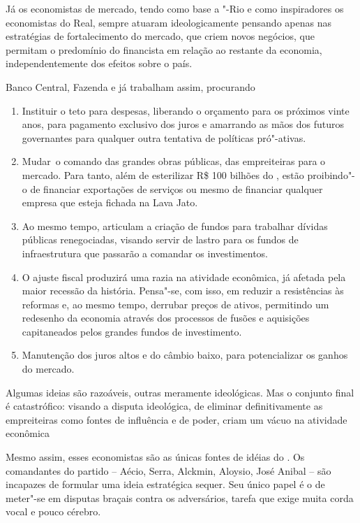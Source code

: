 Já os economistas de mercado, tendo como base a "-Rio e como
inspiradores os economistas do Real, sempre atuaram ideologicamente
pensando apenas nas estratégias de fortalecimento do mercado, que criem
novos negócios, que permitam o predomínio do financista em relação ao
restante da economia, independentemente dos efeitos sobre o país.

Banco Central, Fazenda e  já trabalham assim, procurando

\begin{enumerate}
\itemsep1pt\parskip0pt
\item
  Instituir o teto para despesas, liberando o orçamento para os próximos
  vinte anos, para pagamento exclusivo dos juros e amarrando as mãos dos
  futuros governantes para qualquer outra tentativa de políticas
  pró"-ativas.
\item
  Mudar~o comando das grandes obras públicas, das empreiteiras para o
  mercado. Para tanto, além de esterilizar R\$ 100 bilhões do ,
  estão proibindo"-o de financiar exportações de serviços ou mesmo de
  financiar qualquer empresa que esteja fichada na Lava Jato.
\item
  Ao mesmo tempo, articulam a criação de fundos para trabalhar dívidas
  públicas renegociadas, visando servir de lastro para os fundos de
  infraestrutura que passarão a comandar os investimentos.
\item
  O ajuste fiscal produzirá uma razia na atividade econômica, já afetada
  pela maior recessão da história. Pensa"-se, com isso, em reduzir a
  resistências às reformas e, ao mesmo tempo, derrubar preços de ativos,
  permitindo um redesenho da economia através dos processos de fusões e
  aquisições capitaneados pelos grandes fundos de investimento.
\item
  Manutenção dos juros altos e do câmbio baixo, para potencializar os
  ganhos do mercado.
\end{enumerate}

Algumas ideias são razoáveis, outras meramente ideológicas. Mas o
conjunto final é catastrófico: visando a disputa ideológica, de eliminar
definitivamente as empreiteiras como fontes de influência e de poder,
criam um vácuo na atividade econômica

Mesmo assim, esses economistas são as únicas fontes de idéias do .
Os comandantes do partido -- Aécio, Serra, Alckmin, Aloysio, José Anibal
-- são incapazes de formular uma ideia estratégica sequer. Seu único
papel é o de meter"-se em disputas braçais contra os adversários, tarefa
que exige muita corda vocal e pouco cérebro.

